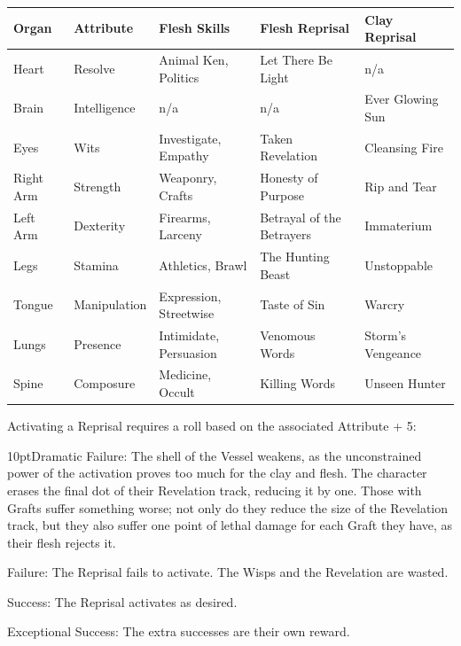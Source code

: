 \begin{table}[H]
    \begin{tabular}{|l|l|l|l|l|}
        \hline
        Organ     & Attribute    & Flesh Skills            & Flesh Reprisal             & Clay Reprisal      \\ \hline
        Heart     & Resolve      & Animal Ken, Politics    & Let There Be Light         & 	n/a               \\ \hline
        Brain     & Intelligence & 	n/a                    & 	n/a                       & Ever Glowing Sun   \\ \hline
        Eyes      & Wits         & Investigate, Empathy    & Taken Revelation           & Cleansing Fire     \\ \hline
        Right Arm & Strength     & Weaponry, Crafts        & Honesty of Purpose         & Rip and Tear       \\ \hline
        Left Arm  & Dexterity    & Firearms, Larceny       & Betrayal of the Betrayers  & Immaterium         \\ \hline
        Legs      & Stamina      & Athletics, Brawl        & The Hunting Beast          & Unstoppable        \\ \hline
        Tongue    & Manipulation & Expression, Streetwise  & Taste of Sin        & Warcry  \\ \hline
        Lungs     & Presence     & Intimidate, Persuasion  & Venomous Words             & Storm’s Vengeance  \\ \hline
        Spine     & Composure    & Medicine, Occult     & Killing Words              & Unseen Hunter      \\
        \hline
    \end{tabular}
\end{table}

Activating a Reprisal requires a roll based on the associated Attribute + 5:

    \begin{myindentpar}{10pt}Dramatic Failure: The shell of the Vessel weakens, as the unconstrained power of the activation proves too much for the clay and flesh. The character erases the final dot of their Revelation track, reducing it by one. Those with Grafts suffer something worse; not only do they reduce the size of the Revelation track, but they also suffer one point of lethal damage for each Graft they have, as their flesh rejects it. 
    
    Failure: The Reprisal fails to activate. The Wisps and the Revelation are wasted. 
    
    Success: The Reprisal activates as desired. 
    
    Exceptional Success: The extra successes are their own reward. \end{myindentpar}
    
